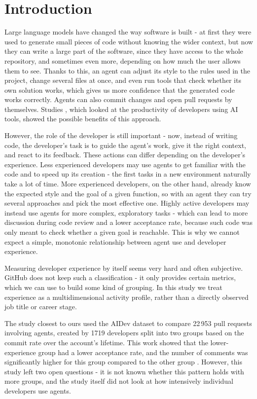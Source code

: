 \section{Introduction}\label{sec:introduction}

Large language models have changed the way software is built - at first they were used to generate small pieces of code without knowing the wider context, but now they can write a large part of the software, since they have access to the whole repository, and sometimes even more, depending on how much the user allows them to see. Thanks to this, an agent can adjust its style to the rules used in the project, change several files at once, and even run tools that check whether its own solution works, which gives us more confidence that the generated code works correctly. Agents can also commit changes and open pull requests by themselves. Studies \cite{barke2023grounded,peng2023impact}, which looked at the productivity of developers using AI tools, showed the possible benefits of this approach.

However, the role of the developer is still important - now, instead of writing code, the developer's task is to guide the agent's work, give it the right context, and react to its feedback. These actions can differ depending on the developer's experience. Less experienced developers may use agents to get familiar with the code and to speed up its creation - the first tasks in a new environment naturally take a lot of time. More experienced developers, on the other hand, already know the expected style and the goal of a given function, so with an agent they can try several approaches and pick the most effective one. Highly active developers may instead use agents for more complex, exploratory tasks - which can lead to more discussion during code review and a lower acceptance rate, because such code was only meant to check whether a given goal is reachable. This is why we cannot expect a simple, monotonic relationship between agent use and developer experience.

Measuring developer experience by itself seems very hard and often subjective. GitHub does not keep such a classification - it only provides certain metrics, which we can use to build some kind of grouping. In this study we treat experience as a multidimensional activity profile, rather than a directly observed job title or career stage.

The study closest to ours used the AIDev dataset to compare 22\,953 pull requests involving agents, created by 1719 developers split into two groups based on the commit rate over the account's lifetime. This work showed that the lower-experience group had a lower acceptance rate, and the number of comments was significantly higher for this group compared to the other group \cite{asdaque2026novice}. However, this study left two open questions - it is not known whether this pattern holds with more groups, and the study itself did not look at how intensively individual developers use agents.

